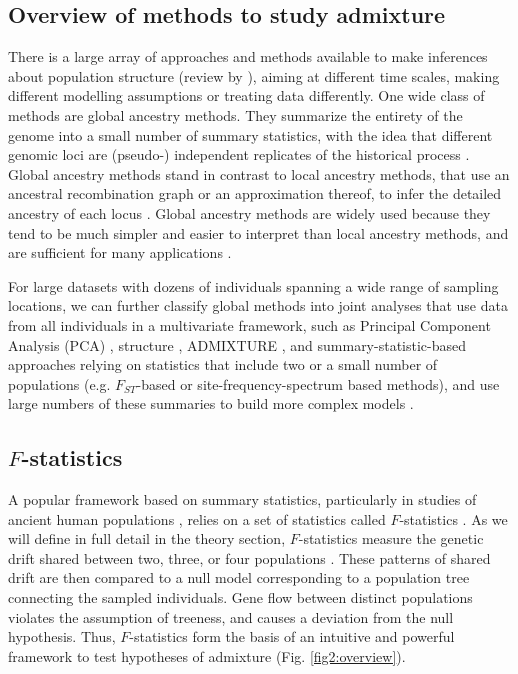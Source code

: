 \documentclass[12pt]{article}
\begin{document}
\subsection{Overview of methods to study admixture}
There is a large array of approaches and methods available to make inferences about population structure (review by \cite{schraiber_methods_2015}), aiming at different time scales, making different modelling assumptions or treating data differently. 
One wide class of methods are global ancestry methods. They summarize the entirety of the genome into a small number of summary statistics, with the idea that different genomic loci are (pseudo-) independent replicates of the historical process \citep{pritchard_inference_2000, gopalan_scaling_2016, patterson_ancient_2012,alexander_fast_2009, tang_estimation_2005}. Global ancestry methods stand in contrast to local ancestry methods, that use an ancestral recombination graph or an approximation thereof, to infer the detailed ancestry of each locus  \citep{lawson_inference_2012, hellenthal_genetic_2014, speidel_method_2019, kelleher_inferring_2019}. Global ancestry methods are widely used because they tend to be much simpler and easier to interpret than local ancestry methods, and are sufficient for many applications \citep{pritchard_inference_2000, patterson_population_2006}.

For large datasets with dozens of individuals spanning a wide range of sampling locations, we can further classify global methods into joint analyses that use data from all individuals in a multivariate framework, such as Principal Component Analysis (PCA) \citep{cavalli-sforza_analysis_1975, patterson_population_2006, novembre_genes_2008}, structure \citep{pritchard_inference_2000}, ADMIXTURE \citep{alexander_fast_2009}, and summary-statistic-based approaches relying on statistics that include two or a small number of populations (e.g. $F_{ST}$-based or site-frequency-spectrum based methods), and use large numbers of these summaries to build more complex models \citep{excoffier_fastsimcoal_2011, kamm_efficiently_2020, gutenkunst_inferring_2009}. 

\subsection{$F$-statistics}
A popular framework based on summary statistics, particularly in studies of ancient human populations \citep{orlando_ancient_2021}, relies on a set of statistics called $F$-statistics \citep{patterson_ancient_2012, peter_admixture_2016}. As we will define in full detail in the theory section, $F$-statistics measure the genetic drift shared between two, three, or four populations \citep{patterson_ancient_2012, peter_admixture_2016}.  These patterns of shared drift are then compared to a null model corresponding to a population tree connecting the sampled individuals. Gene flow between distinct populations violates the assumption of treeness, and causes a deviation from the null hypothesis. Thus, $F$-statistics form the basis of an intuitive and powerful framework to test hypotheses of admixture (Fig. \ref{fig2:overview}). 
\end{document}

